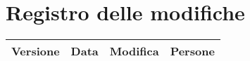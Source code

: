 \section{Registro delle modifiche}

\begin{center}
    \begin{tabularx}{\linewidth}{|l|l|X|X|}
        \hline
        \textbf{Versione} & \textbf{Data} & \textbf{Modifica}& \textbf{Persone}\\
        \hline
    \end{tabularx}
\end{center}
